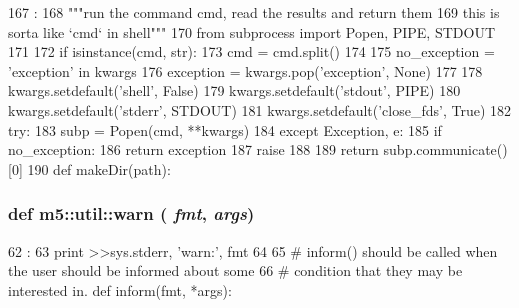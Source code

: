 \begin{DoxyCode}
167                               :
168     """run the command cmd, read the results and return them
169     this is sorta like `cmd` in shell"""
170     from subprocess import Popen, PIPE, STDOUT
171 
172     if isinstance(cmd, str):
173         cmd = cmd.split()
174 
175     no_exception = 'exception' in kwargs
176     exception = kwargs.pop('exception', None)
177     
178     kwargs.setdefault('shell', False)
179     kwargs.setdefault('stdout', PIPE)
180     kwargs.setdefault('stderr', STDOUT)
181     kwargs.setdefault('close_fds', True)
182     try:
183         subp = Popen(cmd, **kwargs)
184     except Exception, e:
185         if no_exception:
186             return exception
187         raise
188 
189     return subp.communicate()[0]
190 
def makeDir(path):
\end{DoxyCode}
\hypertarget{namespacem5_1_1util_af8ddd678b5f4fc6b3d4d6e06291b4bb4}{
\subsubsection[{warn}]{\setlength{\rightskip}{0pt plus 5cm}def m5::util::warn ( {\em fmt}, \/   {\em args})}}
\label{namespacem5_1_1util_af8ddd678b5f4fc6b3d4d6e06291b4bb4}



\begin{DoxyCode}
62                     :
63     print >>sys.stderr, 'warn:', fmt %
64 
65 # inform() should be called when the user should be informed about some
66 # condition that they may be interested in.
def inform(fmt, *args):
\end{DoxyCode}
